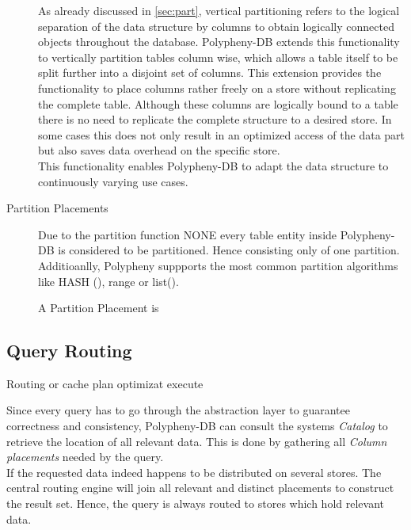 \begin{description}
    As already discussed in \ref{sec:part}, vertical partitioning refers to the logical 
    separation of the data structure by columns to obtain logically connected objects throughout 
    the database. 
    Polypheny-DB extends this functionality to vertically partition tables
    column wise, which allows a table itself to be split further into a disjoint 
    set of columns. This extension provides the functionality to place columns 
    rather freely on a store without replicating the complete table. 
    Although these columns are logically bound to a table there is no need 
    to replicate the complete structure to a desired store. In some cases 
    this does not only result in an optimized access of the data part but 
    also saves data overhead on the specific store.\\
    This functionality enables Polypheny-DB to adapt the data structure to continuously 
    varying use cases.\\

    \item [Partition Placements] Due to the partition function NONE every table entity inside Polypheny-DB is considered to be partitioned.  Hence consisting only of one partition.
    Additioanlly, Polypheny suppports the most common partition algorithms like HASH (), range or list(). 
    
    A Partition Placement is 
\end{description}





\subsection{Query Routing}

Routing or cache plan optimizat execute

Since every query has to go through the abstraction layer to guarantee correctness 
and consistency, Polypheny-DB can consult the systems \textit{Catalog} to retrieve the
location of all relevant data. This is done by gathering all 
\textit{Column placements} needed by the query.\\ 
If the requested data indeed happens to be distributed
on several stores. The central routing engine will join all relevant and distinct 
placements to construct the result set. Hence, the query is always routed to stores which 
hold relevant data.


